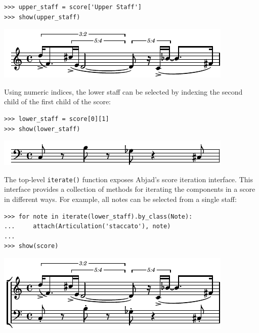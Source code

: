 \documentclass{article}
\begin{document}
\begin{lstlisting}
>>> upper_staff = score['Upper Staff']
>>> show(upper_staff)
\end{lstlisting}
\noindent\includegraphics{assets/lilypond-dcce2b5927dd4f606034c3efcde7da2e.pdf}

\noindent Using numeric indices, the lower staff can be selected by indexing
the second child of the first child of the score:

\begin{lstlisting}
>>> lower_staff = score[0][1]
>>> show(lower_staff)
\end{lstlisting}
\noindent\includegraphics{assets/lilypond-fa746e527d218a814e36af2f46d314bb.pdf}

\noindent The top-level \texttt{iterate()} function exposes Abjad's score
iteration interface. This interface provides a collection of methods for
iterating the components in a score in different ways. For example, all notes
can be selected from a single staff:

\begin{lstlisting}
>>> for note in iterate(lower_staff).by_class(Note):
...     attach(Articulation('staccato'), note)
...
>>> show(score)
\end{lstlisting}
\noindent\includegraphics{assets/lilypond-b7a01ad584c3c470c0bbff20fbc76741.pdf}
\end{document}
